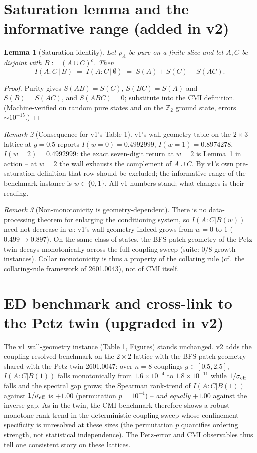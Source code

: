 \documentclass[11pt]{article}
\newtheorem{lemma}{Lemma}[section]
\theoremstyle{remark}
\newtheorem{remark}[lemma]{Remark}
\begin{document}
\section{Saturation lemma and the informative range (added in v2)}
\begin{lemma}[Saturation identity]
\label{lem:sat}
Let $\rho_{\Lambda}$ be pure on a finite slice and let $A, C$ be disjoint
with $B := (A \cup C)^c$. Then
\[
I(A{:}C \,|\, B) \;=\; I(A{:}C \,|\, \emptyset) \;=\;
S(A) + S(C) - S(AC).
\]
\end{lemma}
\begin{proof}
Purity gives $S(AB) = S(C)$, $S(BC) = S(A)$ and $S(B) = S(AC)$, and
$S(ABC) = 0$; substitute into the CMI definition.
(Machine-verified on random pure states and on the $\mathbb{Z}_2$ ground
state, errors $\sim 10^{-15}$.)
\end{proof}
\begin{remark}[Consequence for v1's Table 1]
\label{rem:table}
v1's wall-geometry table on the $2\times3$ lattice at $g = 0.5$ reports
$I(w{=}0) = 0.4992999$, $I(w{=}1) = 0.8974278$, $I(w{=}2) = 0.4992999$:
the exact seven-digit return at $w = 2$ is Lemma~\ref{lem:sat} in action
-- at $w = 2$ the wall exhausts the complement of $A \cup C$. By v1's own
pre-saturation definition that row should be excluded; the informative
range of the benchmark instance is $w \in \{0, 1\}$. All v1 numbers
stand; what changes is their reading.
\end{remark}
\begin{remark}[Non-monotonicity is geometry-dependent]
\label{rem:mono}
There is no data-processing theorem for enlarging the conditioning
system, so $I(A{:}C|B(w))$ need not decrease in $w$: v1's wall geometry
indeed grows from $w = 0$ to $1$ ($0.499 \to 0.897$). On the same class
of states, the BFS-patch geometry of the Petz twin decays monotonically
across the full coupling sweep (suite: $0/8$ growth instances). Collar
monotonicity is thus a property of the collaring rule (cf.\ the
collaring-rule framework of 2601.0043), not of CMI itself.
\end{remark}

\section{ED benchmark and cross-link to the Petz twin (upgraded in v2)}
The v1 wall-geometry instance (Table 1, Figures) stands unchanged. v2
adds the coupling-resolved benchmark on the $2\times2$ lattice with the
BFS-patch geometry shared with the Petz twin 2601.0047: over $n = 8$
couplings $g \in [0.5, 2.5]$, $I(A{:}C|B(1))$ falls monotonically from
$1.6\times10^{-4}$ to $1.8\times10^{-11}$ while $1/\sigma_{\rm eff}$
falls and the spectral gap grows; the Spearman rank-trend of
$I(A{:}C|B(1))$ against $1/\sigma_{\rm eff}$ is $+1.00$ (permutation
$p = 10^{-4}$) -- \emph{and equally} $+1.00$ against the inverse gap. As
in the twin, the CMI benchmark therefore shows a robust monotone
rank-trend in the deterministic coupling sweep whose confinement
specificity is unresolved at these sizes (the permutation $p$ quantifies
ordering strength, not statistical independence). The Petz-error and CMI
observables thus tell one consistent story on these lattices.
\end{document}
